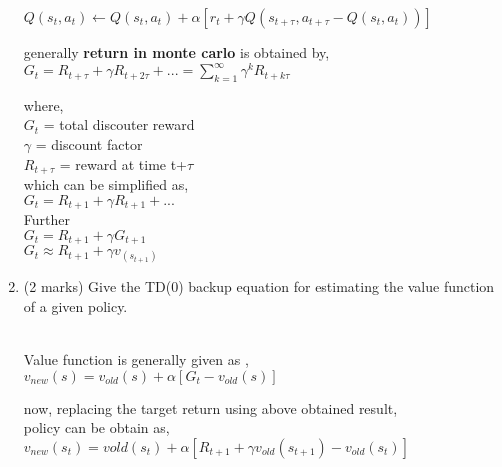 \documentclass[addpoints,12pt,solution]{exam}
\begin{document}
\begin{questions}
\begin{enumerate}[label=(\alph*)]
\begin{solution}
$Q(s_t,a_t) \leftarrow Q(s_t,a_t) + \alpha [r_t + \gamma Q(s_{t+\tau},a_{t+\tau} - Q(s_t,a_t))]$

generally \textbf{return in monte carlo} is obtained by,\\
$G_t = R_{t+\tau} + \gamma R_{t+2 \tau} + ... = \sum_{k=1}^{\infty} \gamma^k R_{t+k \tau }$

where, \\
$G_t$  = total discouter reward \\
$\gamma$ = discount factor\\
$R_{t+\tau }$ = reward at time t+$\tau$ \\

which can be simplified as, \\
$G_t = R_{t+1} + \gamma R_{t+1} + ...$ \\
Further \\
$G_t = R_{t+1} + \gamma G_{t+1}$ \\
\textbf{$G_t \approx R_{t+1} + \gamma v_(s_{t+1})$ } \cite{TD0}

\end{solution}
\item (2 marks) Give the TD(0) backup equation for estimating the value function of a given policy.
\begin{solution}
\\
Value function is generally given as\cite{TD0} ,\\
$v_{new}(s) = v_{old}(s) + \alpha [G_t -v_{old}(s) ]$

now, replacing the target return using above obtained result,\\
policy can be obtain as,\\
$v_{new}(s_t) = v{old}(s_t) + \alpha [ R_{t+1} + \gamma v_{old}(s_{t+1}) -v_{old}(s_t) ]$

\end{solution}
\end{enumerate}
\end{questions}
\newpage



		
\end{document}
